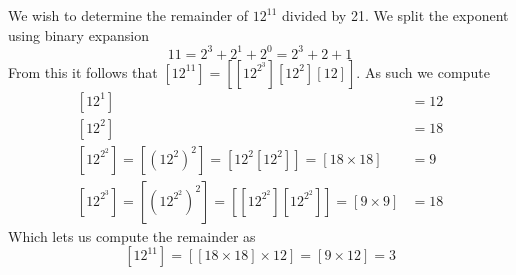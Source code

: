 \begin{exmp}
    We wish to determine the remainder of $12^{11}$ divided by 21. We split the exponent using binary expansion
    \[
        11=2^{3}+2^{1}+2^{0}=2^{3}+2+1
    \]
    From this it follows that $\left[12^{11}\right]=\left[\left[12^{2^{3}}\right]\left[12^{2}\right]\left[12\right]\right]$. As such we compute
    \begin{align*}
        \left[12^{1}\right]&=12 \\
        \left[12^{2}\right]&=18 \\
        \left[12^{2^{2}}\right]=\left[(12^{2})^{2}\right]=\left[12^{2}\left[12^{2}\right]\right]=\left[18\times 18\right]&=9 \ \\
        \left[12^{2^{3}}\right]=\left[\left(12^{2^{2}}\right)^{2}\right]=\left[\left[12^{2^{2}}\right]\left[12^{2^{2}}\right]\right]=\left[9\times 9\right]&=18
    \end{align*}
    Which lets us compute the remainder as
    \[
        \left[12^{11}\right]=\left[[18\times 18]\times 12\right]=[9\times 12]=3
    \]
\end{exmp}
